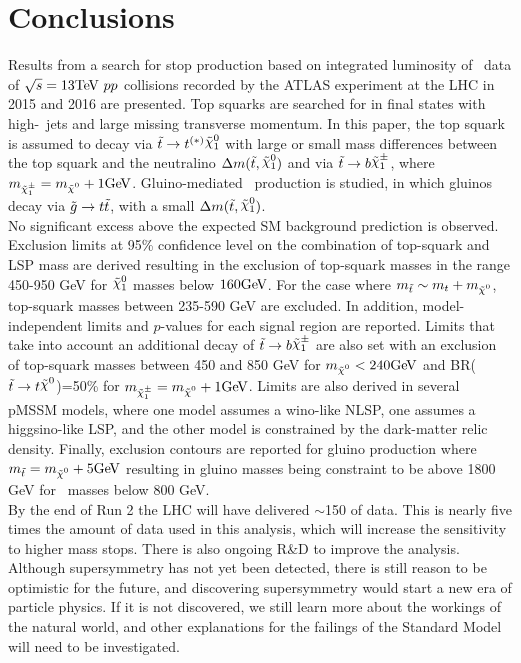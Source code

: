 \chapter{Conclusions}
\label{ch:conclusion}


Results from a search for stop production based
on integrated luminosity of \lumi\ data of $\rts = 13 \tev ~pp$ 
collisions recorded by the ATLAS experiment at the LHC in 2015 and
2016 are presented. Top squarks are searched for in
final states with high-\pT\ jets and large missing transverse
momentum. In this paper, the top squark is assumed to decay via $\stop
\rightarrow t^{(*)} \ninoone$ with large or small mass differences between the top squark and the neutralino $\Delta
m(\stop,\ninoone)$ and via $\stop\to b \chinoonepm$, where $m_{\chinoonepm}=\mLSP+1\gev$. 
Gluino-mediated \stop\ production is
studied, in which gluinos decay via $\tilde{g}\rightarrow t\tilde{t}$, with a
small $\Delta m(\stop,\ninoone)$. \\

No significant excess above the expected SM background prediction is observed. Exclusion limits at 95\% confidence level on the combination of top-squark and LSP mass are derived resulting in the exclusion of top-squark masses in the range 450-950 GeV for $\ninoone$ masses below $160\GeV$. For the case where $\mstop\sim m_t+\mLSP$, top-squark masses between 235-590 GeV are excluded. In addition, model-independent limits and $p$-values for each signal region are reported. Limits that take into account an additional decay of $\stop\to b \chinoonepm$ are also set with an exclusion of top-squark masses between 450 and 850 GeV for $\mLSP<240\gev$ and BR($\stop\to t \LSP$)=50\% for $m_{\chinoonepm}=\mLSP+1\gev$. Limits are also derived in several pMSSM models, where one model assumes a wino-like NLSP, one assumes a higgsino-like LSP, and the other model is constrained by the dark-matter relic density.  Finally, exclusion contours are reported for gluino production where $\mstop=\mLSP+5\gev$ resulting in gluino masses being constraint to be above 1800 GeV for \stop\ masses below 800 GeV. \\

By the end of Run 2 the LHC will have delivered $\sim$150 \ifb of data.  This is nearly five times the amount of data used in this analysis, which will increase the sensitivity to higher mass stops.  There is also ongoing R\&D to improve the analysis.  Although supersymmetry has not yet been detected, there is still reason to be optimistic for the future, and discovering supersymmetry would start a new era of particle physics.  If it is not discovered, we still learn more about the workings of the natural world, and other explanations for the failings of the Standard Model will need to be investigated.  


